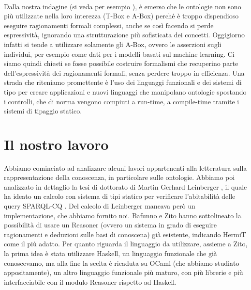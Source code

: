 \paragraph{} Dalla nostra indagine (si veda per esempio \cite{baader2017introductionDL}), è emerso che le ontologie non sono più utilizzate nella loro interezza (T-Box e A-Box) perché è troppo dispendioso eseguire ragionamenti formali complessi, anche se così facendo si perde espressività, ignorando una strutturazione più sofisticata dei concetti. Oggigiorno infatti si tende a utilizzare solamente gli A-Box, ovvero le asserzioni sugli individui, per esempio come dati per i modelli basati sul machine learning. Ci siamo quindi chiesti se fosse possibile costruire formalismi che recuperino parte dell'espressività dei ragionamenti formali, senza perdere troppo in efficienza. Una strada che riteniamo promettente è l'uso dei linguaggi funzionali e dei sistemi di tipo per creare applicazioni e nuovi linguaggi che manipolano ontologie spostando i controlli, che di norma vengono compiuti a run-time, a compile-time tramite i sistemi di tipaggio statico.     

\section{Il nostro lavoro}
\paragraph{} Abbiamo cominciato ad analizzare alcuni lavori appartenenti alla letteratura sulla rappresentazione della conoscenza, in particolare sulle ontologie. Abbiamo poi analizzato in dettaglio la tesi di dottorato di Martin Gerhard Leinberger \cite{leinbergerphdthesis}, il quale ha ideato un calcolo con sistema di tipi statico per verificare l'abitabilità delle query SPARQL-CQ \cite{}. Del calcolo di Leinberger mancava però un implementazione, che abbiamo fornito noi. Bafunno e Zito hanno sottolineato la possibilità di usare un Reasoner (ovvero un sistema in grado di eseguire ragionamenti e deduzioni sulle basi di conoscena) già esistente, indicando HermiT come il più adatto. Per quanto riguarda il linguaggio da utilizzare, assieme a Zito, la prima idea è stata utilizzare Haskell, un linguaggio funzionale che già conoscevamo, ma alla fine la scelta è ricaduta su OCaml (che abbiamo studiato appositamente), un altro linguaggio funzionale più maturo, con più librerie e più interfacciabile con il modulo Reasoner rispetto ad Haskell. 

